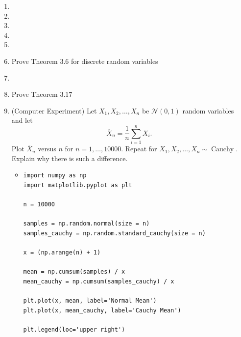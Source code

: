 \documentclass{article}
\begin{document}
\begin{enumerate}
	\item 
	\item 
	\item
	\item 
	\item
	\item Prove Theorem 3.6 for discrete random variables
	\item 
	\item Prove Theorem 3.17
	\item (Computer Experiment) Let $X_1, X_2, \dots, X_n$ be $\mathcal{N}(0, 1)$ random variables and let
	$$
	\overline{X}_n = \frac{1}{n} \sum_{i = 1}^n X_i.
	$$
	Plot $\overline{X}_n$ versus $n$ for $n = 1, \dots, 10000$. Repeat for $X_1, X_2, \dots, X_n \sim \operatorname{Cauchy}$. Explain why there is such a difference.
		\begin{itemize}
			\item
			\begin{verbatim}
import numpy as np
import matplotlib.pyplot as plt

n = 10000

samples = np.random.normal(size = n)
samples_cauchy = np.random.standard_cauchy(size = n)

x = (np.arange(n) + 1)

mean = np.cumsum(samples) / x
mean_cauchy = np.cumsum(samples_cauchy) / x

plt.plot(x, mean, label='Normal Mean')
plt.plot(x, mean_cauchy, label='Cauchy Mean')

plt.legend(loc='upper right')


\end{verbatim}
\end{itemize}
\end{enumerate}
\end{document}
